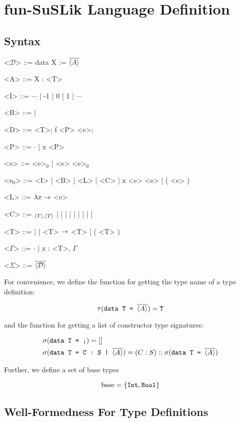 \documentclass[10pt]{article}
\begin{document}
\section{fun-SuSLik Language Definition}
\label{sec:FSDef}
\subsection{Syntax}

\begin{grammar}
  <$\mathcal{D}$> ::= data X := $\overline{\langle A \rangle}$

  <A> ::= X : <T>

  <I> ::= $\cdots$ | -1 | 0 | 1 | $\cdots$

  <B> ::=  | 

  <D> ::=  <T>; f <P> \ttt{:=} <e>;

  <P> ::= $\cdot$ | x <P>

  <e> ::= <e>$_0$ | <e> <e>$_0$

  <e$_0$> ::= <I> | <B> | <L> | <C> | \; x \ttt{:=} <e> \inexpr\; <e> | ( <e> )

  <L> ::= $\lambda x \rightarrow$ <e>

  <C> ::= $_{\langle T \rangle,\langle T \rangle}$ |  | \ite\; | \lesseq\; | \eq\; | \add\; | \sub\; | \; | \; | 

  <T> ::=  |  | <T> $\rightarrow$ <T> | ( <T> )

  <$\Gamma$> ::= $\cdot$ | x : <T>, $\Gamma$

  <$\Sigma$> ::= $\overline{\langle \mathcal{D} \rangle}$
\end{grammar}

\noindent
For convenience, we define the function for getting the type name of a type definition:

\[
  \tau(\texttt{data T = }\overline{\langle A \rangle}) = \texttt{T}
\]

and the function for getting a list of constructor type signatures:

\begin{align*}
  &\sigma(\texttt{data T = ;}) = []
  \\
  &\sigma(\texttt{data T = C : S | }\overline{\langle A \rangle}) = (C : S) :: \sigma({\texttt{data T = }}\overline{\langle A \rangle})
\end{align*}

Further, we define a set of base types

\[
  \textnormal{base} = \{\texttt{Int}, \texttt{Bool}\}
\]

\subsection{Well-Formedness For Type Definitions}
\end{document}
